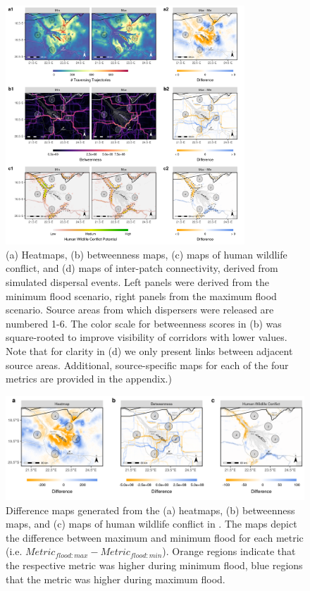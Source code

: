 \documentclass[abstract=on,10pt,a4paper,bibliography=totocnumbered]{article}
\begin{document}
\begin{figure}
 \begin{center}
  \includegraphics[width = 0.8\textwidth]{99_Metrics.png}
  \caption{(a) Heatmaps, (b) betweenness maps, (c) maps of human wildlife
   conflict, and (d) maps of inter-patch connectivity, derived from simulated
   dispersal events. Left panels were derived from the minimum flood scenario,
   right panels from the maximum flood scenario. Source areas from which
   dispersers were released are numbered 1-6.  The color scale for betweenness
   scores in (b) was square-rooted to improve visibility of corridors with lower
   values. Note that for clarity in (d) we only present links between adjacent
   source areas. Additional, source-specific maps for each of the four metrics
   are provided in the appendix.)}
  \label{Metrics}
 \end{center}
\end{figure}

\begin{figure}
 \begin{center}
  \includegraphics[width = \textwidth]{99_Difference.png}
  \caption{Difference maps generated from the (a) heatmaps, (b) betweenness
   maps, and (c) maps of human wildlife conflict in . The maps
   depict the difference between maximum and minimum flood for each metric (i.e.
   $Metric_{flood:max} - Metric_{flood:min}$). Orange regions indicate that the
   respective metric was higher during minimum flood, blue regions that the
   metric was higher during maximum flood.}
  \label{Difference}
 \end{center}
\end{figure}
\end{document}
